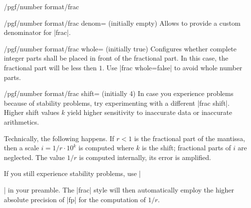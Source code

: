 \begin{key}{/pgf/number format/frac}
\begin{key}{/pgf/number format/frac denom= (initially empty)}
  Allows to provide a custom denominator for |frac|.
\begin{codeexample}[width=3cm]
\hspace{1em}
\hspace{1em}
\hspace{1em}
\hspace{1em}
\hspace{1em}
\end{codeexample}
\end{key}
\begin{key}{/pgf/number format/frac whole= (initially true)}
  Configures whether complete integer parts shall be placed in front
  of the fractional part. In this case, the fractional part will be
  less then $1$. Use |frac whole=false| to avoid whole number parts. 
\begin{codeexample}[width=3cm]
\hspace{1em}
\hspace{1em}
\hspace{1em}
\hspace{1em}
\hspace{1em}
\end{codeexample}
\end{key}
\begin{key}{/pgf/number format/frac shift= (initially 4)}
  In case you experience problems because of stability problems, try
  experimenting with a different |frac shift|. Higher shift values $k$
  yield higher sensitivity to inaccurate data or inaccurate
  arithmetics. 

  Technically, the following happens. If $r < 1$ is the fractional
  part of the mantissa, then a scale $i = 1/r \cdot 10^k$ is computed
  where $k$ is the shift; fractional parts of $i$ are neglected. The
  value $1/r$ is computed internally, its error is amplified. 

  If you still experience stability problems, use |\usepackage{fp}| in
  your preamble. The |frac| style will then automatically employ the
  higher absolute precision of |fp| for the computation of $1/r$. 
\end{key}
\end{key}

